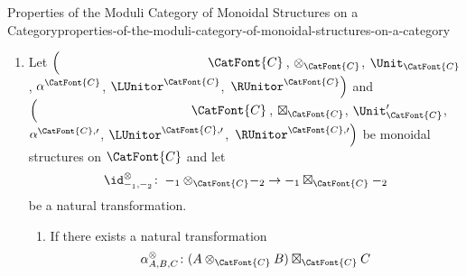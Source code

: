 \begin{proposition}{Properties of the Moduli Category of Monoidal Structures on a Category}{properties-of-the-moduli-category-of-monoidal-structures-on-a-category}
\begin{enumerate}
\begin{enumerate}
                    \[
                        \begin{tikzcd}[row sep={5.0*\the\DL,between origins}, column sep={12.25*\the\DL,between origins}, background color=backgroundColor, ampersand replacement=\&]
                            A\otimes_{\CatFont{C}}(B\otimes_{\CatFont{C}}C)
                            \arrow[r,"\id_{A}\otimes_{\CatFont{C}}\id^{\otimes}_{B,C}"]
                            \arrow[d,"\id^{\otimes}_{A,B\otimes_{\CatFont{C}}C}"']
                            \&
                            A\otimes_{\CatFont{C}}(B\boxtimes_{\CatFont{C}}C)
                            \arrow[d,"\id^{\otimes}_{A,B\boxtimes_{\CatFont{C}}C}"]
                            \\
                            A\boxtimes_{\CatFont{C}}(B\otimes_{\CatFont{C}}C)
                            \arrow[r,"\id_{A}\boxtimes_{\CatFont{C}}\id^{\otimes}_{B,C}"']
                            \&
                            A\boxtimes_{\CatFont{C}}(B\boxtimes_{\CatFont{C}}C)
                        \end{tikzcd}
                    \]%
                    commutes.
            \end{enumerate}
        \item\label{properties-of-the-moduli-category-of-monoidal-structures-on-a-category-mixed-associators}Let $\left(\phantom{\mrp{\LUnitor^{\CatFont{C}}}}\CatFont{C}\right.$, $\otimes_{\CatFont{C}}$, $\Unit_{\CatFont{C}}$, $\alpha^{\CatFont{C}}$, $\LUnitor^{\CatFont{C}}$, $\left.\RUnitor^{\CatFont{C}}\right)$ and $\left(\phantom{\mrp{\LUnitor^{\CatFont{C},\prime}}}\CatFont{C}\right.$, $\boxtimes_{\CatFont{C}}$, $\Unit'_{\CatFont{C}}$, $\alpha^{\CatFont{C},\prime}$, $\LUnitor^{\CatFont{C},\prime}$, $\left.\RUnitor^{\CatFont{C},\prime}\right)$ be monoidal structures on $\CatFont{C}$ and let
            \[
                \id^{\otimes}_{-_{1},-_{2}}%
                \colon%
                -_{1}\otimes_{\CatFont{C}}-_{2}%
                \to%
                -_{1}\boxtimes_{\CatFont{C}}-_{2}%
            \]%
            be a natural transformation. 
            \begin{enumerate}
                \item\label{properties-of-the-moduli-category-of-monoidal-structures-on-a-category-mixed-associators-1}If there exists a natural transformation
                    \[
                        \alpha^{\otimes}_{A,B,C}%
                        \colon%
                        (A\otimes_{\CatFont{C}}B)\boxtimes_{\CatFont{C}}C%
\]
\end{enumerate}
\end{enumerate}
\end{proposition}
